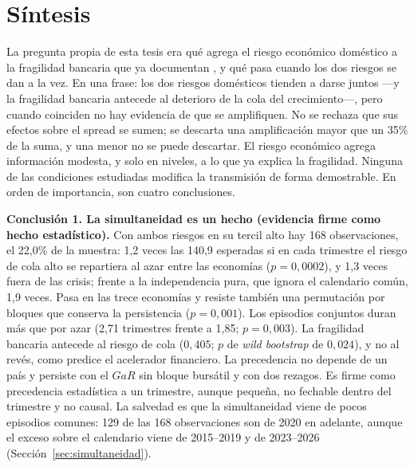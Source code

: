 \section{Síntesis}
\label{sec:sintesis-resultados}

La pregunta propia de esta tesis era qué agrega el riesgo económico doméstico a la fragilidad bancaria que ya documentan \citet{Chari2024b}, y qué pasa cuando los dos riesgos se dan a la vez. En una frase: los dos riesgos domésticos tienden a darse juntos ---y la fragilidad bancaria antecede al deterioro de la cola del crecimiento---, pero cuando coinciden no hay evidencia de que se amplifiquen. No se rechaza que sus efectos sobre el spread se sumen; se descarta una amplificación mayor que un 35\% de la suma, y una menor no se puede descartar. El riesgo económico agrega información modesta, y solo en niveles, a lo que ya explica la fragilidad. Ninguna de las condiciones estudiadas modifica la transmisión de forma demostrable. En orden de importancia, son cuatro conclusiones.

\textbf{Conclusión 1. La simultaneidad es un hecho (evidencia firme como hecho estadístico).} Con ambos riesgos en su tercil alto hay 168 observaciones, el 22,0\% de la muestra: 1,2 veces las 140,9 esperadas si en cada trimestre el riesgo de cola alto se repartiera al azar entre las economías ($p=0{,}0002$), y 1,3 veces fuera de las crisis; frente a la independencia pura, que ignora el calendario común, 1,9 veces. Pasa en las trece economías y resiste también una permutación por bloques que conserva la persistencia ($p=0{,}001$). Los episodios conjuntos duran más que por azar (2,71 trimestres frente a 1,85; $p=0{,}003$). La fragilidad bancaria antecede al riesgo de cola ($0{,}405$; $p$ de \textit{wild bootstrap} de $0{,}024$), y no al revés, como predice el acelerador financiero. La precedencia no depende de un país y persiste con el $GaR$ sin bloque bursátil y con dos rezagos. Es firme como precedencia estadística a un trimestre, aunque pequeña, no fechable dentro del trimestre y no causal. La salvedad es que la simultaneidad viene de pocos episodios comunes: 129 de las 168 observaciones son de 2020 en adelante, aunque el exceso sobre el calendario viene de 2015--2019 y de 2023--2026 (Sección~\ref{sec:simultaneidad}).

